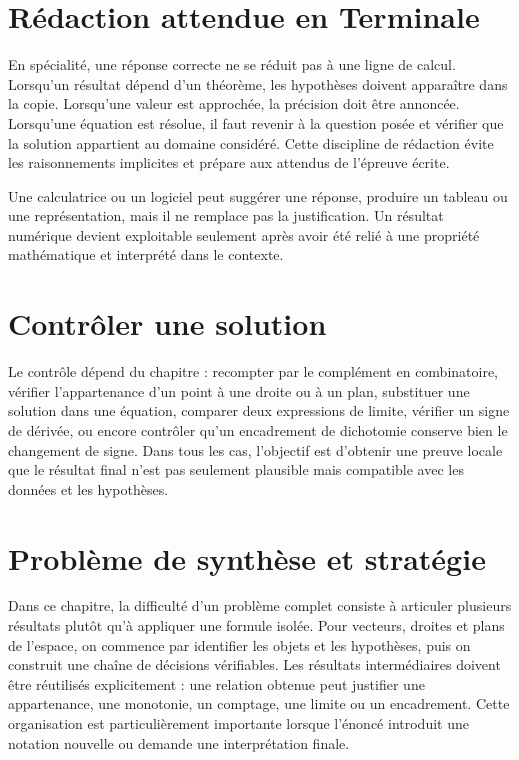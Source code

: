 \section{Rédaction attendue en Terminale}
En spécialité, une réponse correcte ne se réduit pas à une ligne de calcul. Lorsqu'un résultat dépend d'un théorème, les hypothèses doivent apparaître dans la copie. Lorsqu'une valeur est approchée, la précision doit être annoncée. Lorsqu'une équation est résolue, il faut revenir à la question posée et vérifier que la solution appartient au domaine considéré. Cette discipline de rédaction évite les raisonnements implicites et prépare aux attendus de l'épreuve écrite.

\begin{attention}
Une calculatrice ou un logiciel peut suggérer une réponse, produire un tableau ou une représentation, mais il ne remplace pas la justification. Un résultat numérique devient exploitable seulement après avoir été relié à une propriété mathématique et interprété dans le contexte.
\end{attention}

\section{Contrôler une solution}
Le contrôle dépend du chapitre : recompter par le complément en combinatoire, vérifier l'appartenance d'un point à une droite ou à un plan, substituer une solution dans une équation, comparer deux expressions de limite, vérifier un signe de dérivée, ou encore contrôler qu'un encadrement de dichotomie conserve bien le changement de signe. Dans tous les cas, l'objectif est d'obtenir une preuve locale que le résultat final n'est pas seulement plausible mais compatible avec les données et les hypothèses.

\section{Problème de synthèse et stratégie}

Dans ce chapitre, la difficulté d'un problème complet consiste à articuler plusieurs résultats plutôt qu'à appliquer une formule isolée. Pour vecteurs, droites et plans de l’espace, on commence par identifier les objets et les hypothèses, puis on construit une chaîne de décisions vérifiables. Les résultats intermédiaires doivent être réutilisés explicitement : une relation obtenue peut justifier une appartenance, une monotonie, un comptage, une limite ou un encadrement. Cette organisation est particulièrement importante lorsque l'énoncé introduit une notation nouvelle ou demande une interprétation finale.


